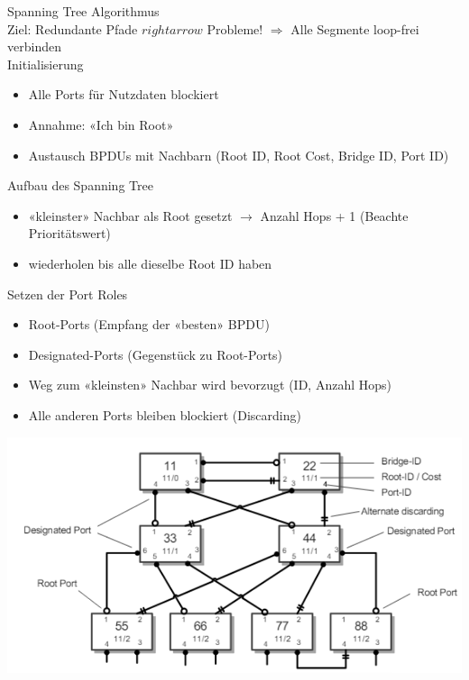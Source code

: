 \begin{KR}{Spanning Tree Algorithmus}\\
    Ziel: Redundante Pfade $rightarrow$ Probleme! $\Rightarrow$ Alle Segmente loop-frei verbinden\\
    Initialisierung
    \begin{itemize}
        \item Alle Ports für Nutzdaten blockiert
        \item Annahme: «Ich bin Root»
        \item Austausch BPDUs mit Nachbarn (Root ID, Root Cost, Bridge ID, Port ID)
    \end{itemize}
    Aufbau des Spanning Tree
    \begin{itemize}
        \item «kleinster» Nachbar als Root gesetzt $\rightarrow$ Anzahl Hops + 1 (Beachte Prioritätswert)
        \item wiederholen bis alle dieselbe Root ID haben
    \end{itemize}
    Setzen der Port Roles
    \begin{itemize}
        \item Root-Ports (Empfang der «besten» BPDU)
        \item Designated-Ports (Gegenstück zu Root-Ports)
        \item Weg zum «kleinsten» Nachbar wird bevorzugt (ID, Anzahl Hops)
        \item Alle anderen Ports bleiben blockiert (Discarding)
    \end{itemize}
        \includegraphics[width=0.8\linewidth]{images/spanning_tree_algorithmus.png}
\end{KR}


